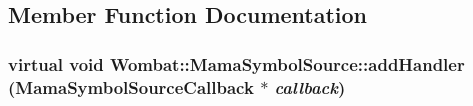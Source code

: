 \subsection{Member Function Documentation}
\hypertarget{classWombat_1_1MamaSymbolSource_ab6ec8acbb7941fd0261f60536608a4fb}{
\subsubsection[{addHandler}]{\setlength{\rightskip}{0pt plus 5cm}virtual void Wombat::MamaSymbolSource::addHandler ({\bf MamaSymbolSourceCallback} $\ast$ {\em callback})}}
\label{classWombat_1_1MamaSymbolSource_ab6ec8acbb7941fd0261f60536608a4fb}
